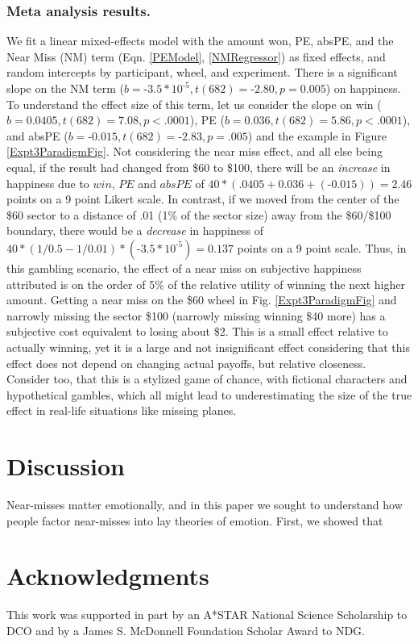 \documentclass[10pt,letterpaper]{article}
\begin{document}
\subsubsection{Meta analysis results.}

We fit a linear mixed-effects model with the amount won, PE, absPE, and the Near Miss (NM) term (Eqn. \ref{PEModel}, \ref{NMRegressor}) as fixed effects, and random intercepts by participant, wheel, and experiment. There is a significant slope on the NM term ($b = \text{-}3.5 * 10^{\text{-}5}, t(682)=\text{-}2.80, p=0.005$) on happiness. To understand the effect size of this term, let us consider the slope on win ($b = 0.0405, t(682) = 7.08, p<.0001$), PE ($b=0.036, t(682)=5.86, p<.0001$), and absPE ($b=\text{-}0.015, t(682) = \text{-}2.83, p=.005$) and the example in Figure \ref{Expt3ParadigmFig}. Not considering the near miss effect, and all else being equal, if the result had changed from \$60 to \$100, there will be an \textit{increase} in happiness due to $win$, $PE$ and $absPE$ of $40*(.0405+0.036+(\text{-}0.015)) = 2.46$ points on a 9 point Likert scale. In contrast, if we moved from the center of the \$60 sector to a distance of .01 (1\% of the sector size) away from the \$60/\$100 boundary, there would be a \textit{decrease} in happiness of $40*(1/0.5 - 1/0.01)*(\text{-}3.5 * 10^{\text{-}5}) = 0.137$ points on a 9 point scale. Thus, in this gambling scenario, the effect of a near miss on subjective happiness attributed is on the order of 5\% of the relative utility of winning the next higher amount. Getting a near miss on the \$60 wheel in Fig. \ref{Expt3ParadigmFig} and narrowly missing the sector \$100 (narrowly missing winning \$40 more) has a subjective cost equivalent to losing about \$2. This is a small effect relative to actually winning, yet it is  a large and not insignificant effect considering that this effect does not depend on changing actual payoffs, but relative closeness. Consider too, that this is a stylized game of chance, with fictional characters and hypothetical gambles, which all might lead to underestimating the size of the true effect in real-life situations like missing planes.


\section{Discussion}

Near-misses matter emotionally, and in this paper we sought to understand how people factor near-misses into lay theories of emotion. First, we showed that 




\section{Acknowledgments}

This work was supported in part by an A*STAR National Science Scholarship to DCO and by a James S. McDonnell Foundation Scholar Award to NDG.




\setlength{\bibleftmargin}{.125in}
\setlength{\bibindent}{-\bibleftmargin}


\end{document}

